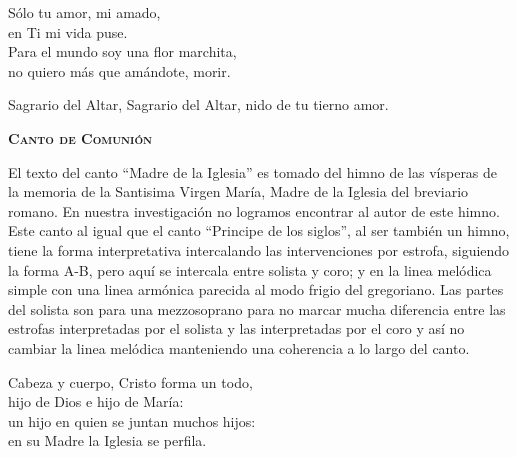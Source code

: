 \documentclass[12pt, letterpaper]{report}
\begin{document}
    \noindent
    S\'olo tu amor, mi amado,\\
    en Ti mi vida puse.\\
    Para el mundo soy una flor marchita,\\
    no quiero m\'as que am\'andote, morir.

    \noindent
    Sagrario del Altar, Sagrario del Altar, nido de tu tierno amor.
    \clearpage




    \begin{center}
        {\scshape \Huge {\bfseries Canto de Comuni\'on}}
    \end{center}

    \Large El texto del canto ``Madre de la Iglesia'' es tomado del himno de las v\'isperas de la memoria de la
    Santisima Virgen Mar\'ia, Madre de la Iglesia del breviario romano. En nuestra investigaci\'on no logramos
    encontrar al autor de este himno. Este canto al igual que el canto ``Principe de los siglos'', al ser
    tambi\'en un himno, tiene la forma interpretativa intercalando las intervenciones por estrofa, siguiendo la
    forma A-B, pero aqu\'i se intercala entre solista y coro; y en la linea mel\'odica simple con una linea arm\'onica
    parecida al modo frigio del gregoriano. Las partes del solista son para una mezzosoprano para no marcar mucha
    diferencia entre las estrofas interpretadas por el solista y las interpretadas por el coro y as\'i no cambiar la
    linea mel\'odica manteniendo una coherencia a lo largo del canto.

    \noindent
    \LARGE Cabeza y cuerpo, Cristo forma un todo,\\
    hijo de Dios e hijo de Mar\'ia:\\
    un hijo en quien se juntan muchos hijos:\\
    en su Madre la Iglesia se perfila.
\end{document}
